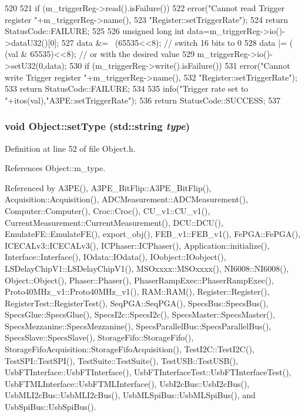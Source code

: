 \begin{DoxyCode}
520                                                {
521   if (m_triggerReg->read().isFailure()){
522     error("Cannot read Trigger register "+m_triggerReg->name(),
523         "Register::setTriggerRate");
524     return StatusCode::FAILURE;
525   }
526   unsigned long int data=m_triggerReg->io()->dataU32()[0];
527   data &= ~(65535<<8); // switch 16 bits to 0
528   data |= ( (val & 65535)<<8);   // or with the desired value
529   m_triggerReg->io()->setU32(0,data);
530   if (m_triggerReg->write().isFailure()){
531     error("Cannot write Trigger register "+m_triggerReg->name(),
532         "Register::setTriggerRate");
533     return StatusCode::FAILURE;
534   }
535   info("Trigger rate set to "+itos(val),"A3PE::setTriggerRate");
536   return StatusCode::SUCCESS;
537 }
\end{DoxyCode}
\hypertarget{classObject_aae534cc9d982bcb9b99fd505f2e103a5}{
\subsubsection[{setType}]{\setlength{\rightskip}{0pt plus 5cm}void Object::setType (std::string {\em type})}}
\label{classObject_aae534cc9d982bcb9b99fd505f2e103a5}


Definition at line 52 of file Object.h.

References Object::m\_\-type.

Referenced by A3PE(), A3PE\_\-BitFlip::A3PE\_\-BitFlip(), Acquisition::Acquisition(), ADCMeasurement::ADCMeasurement(), Computer::Computer(), Croc::Croc(), CU\_\-v1::CU\_\-v1(), CurrentMeasurement::CurrentMeasurement(), DCU::DCU(), EmulateFE::EmulateFE(), export\_\-obj(), FEB\_\-v1::FEB\_\-v1(), FePGA::FePGA(), ICECALv3::ICECALv3(), ICPhaser::ICPhaser(), Application::initialize(), Interface::Interface(), IOdata::IOdata(), IOobject::IOobject(), LSDelayChipV1::LSDelayChipV1(), MSOxxxx::MSOxxxx(), NI6008::NI6008(), Object::Object(), Phaser::Phaser(), PhaserRampExec::PhaserRampExec(), Proto40MHz\_\-v1::Proto40MHz\_\-v1(), RAM::RAM(), Register::Register(), RegisterTest::RegisterTest(), SeqPGA::SeqPGA(), SpecsBus::SpecsBus(), SpecsGlue::SpecsGlue(), SpecsI2c::SpecsI2c(), SpecsMaster::SpecsMaster(), SpecsMezzanine::SpecsMezzanine(), SpecsParallelBus::SpecsParallelBus(), SpecsSlave::SpecsSlave(), StorageFifo::StorageFifo(), StorageFifoAcquisition::StorageFifoAcquisition(), TestI2C::TestI2C(), TestSPI::TestSPI(), TestSuite::TestSuite(), TestUSB::TestUSB(), UsbFTInterface::UsbFTInterface(), UsbFTInterfaceTest::UsbFTInterfaceTest(), UsbFTMLInterface::UsbFTMLInterface(), UsbI2cBus::UsbI2cBus(), UsbMLI2cBus::UsbMLI2cBus(), UsbMLSpiBus::UsbMLSpiBus(), and UsbSpiBus::UsbSpiBus().


